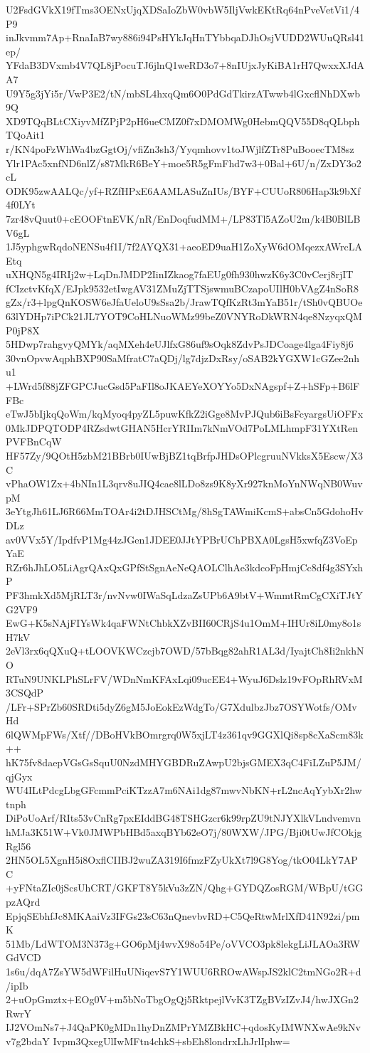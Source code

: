 U2FsdGVkX19fTms3OENxUjqXDSaIoZbW0vbW5IljVwkEKtRq64nPveVetVi1/4P9
inJkvmm7Ap+RnaIaB7wy886i94PsHYkJqHnTYbbqaDJhOsjVUDD2WUuQRsl41ep/
YFdaB3DVxmb4V7QL8jPocuTJ6jlnQ1weRD3o7+8nIUjxJyKiBA1rH7QwxxXJdAA7
U9Y5g3jYi5r/VwP3E2/tN/mbSL4hxqQm6O0PdGdTkirzATwwb4lGxcflNhDXwb9Q
XD9TQqBLtCXiyvMfZPjP2pH6ueCMZ0f7xDMOMWg0HebmQQV55D8qQLbphTQoAit1
r/KN4poFzWhWa4bzGgtOj/vfiZn3sh3/Yyqmhovv1toJWjlfZTr8PuBooecTM8sz
Ylr1PAc5xnfND6nlZ/s87MkR6BeY+moe5R5gFmFhd7w3+0Bal+6U/n/ZxDY3o2cL
ODK95zwAALQc/yf+RZfHPxE6AAMLASuZnIUs/BYF+CUUoR806Hap3k9bXf4f0LYt
7zr48vQuut0+cEOOFtnEVK/nR/EnDoqfudMM+/LP83Tl5AZoU2m/k4B0BlLBV6gL
1J5yphgwRqdoNENSu4f1I/7f2AYQX31+aeoED9uaH1ZoXyW6dOMqezxAWrcLAEtq
uXHQN5g4IRIj2w+LqDnJMDP2IinIZkaog7faEUg0fh930hwzK6y3C0vCerj8rjIT
fCIzctvKfqX/EJpk9532etIwgAV31ZMuZjTTSjswmuBCzapoUIlH0bVAgZ4nSoR8
gZx/r3+lpgQnKOSW6eJfaUeloU9sSsa2b/JrawTQfKzRt3mYaB51r/tSh0vQBUOe
63lYDHp7iPCk21JL7YOT9CoHLNuoWMz99beZ0VNYRoDkWRN4qe8NzyqxQMP0jP8X
5HDwp7rahgvyQMYk/aqMXeh4eUJlfxG86uf9sOqk8ZdvPsJDCoage4lga4Fiy8j6
30vnOpvwAqphBXP90SaMfratC7aQDj/lg7djzDxRsy/oSAB2kYGXW1cGZee2nhu1
+LWrd5f88jZFGPCJucGsd5PaFIl8oJKAEYeXOYYo5DxNAgspf+Z+hSFp+B6lFFBc
eTwJ5bIjkqQoWm/kqMyoq4pyZL5puwKfkZ2iGge8MvPJQub6iBsFcyargsUiOFFx
0MkJDPQTODP4RZsdwtGHAN5HcrYRIIm7kNmVOd7PoLMLhmpF31YXtRenPVFBnCqW
HF57Zy/9QOtH5zbM21BBrb0IUwBjBZ1tqBrfpJHDsOPlcgruuNVkksX5Escw/X3C
vPhaOW1Zx+4bNIn1L3qrv8uJIQ4cae8lLDo8zs9K8yXr927knMoYnNWqNB0WuvpM
3eYtgJh61LJ6R66MmTOAr4i2tDJHSCtMg/8hSgTAWmiKcmS+absCn5GdohoHvDLz
av0VVx5Y/IpdfvP1Mg44zJGen1JDEE0JJtYPBrUChPBXA0LgsH5xwfqZ3VoEpYaE
RZr6hJhLO5LiAgrQAxQxGPfStSgnAeNeQAOLClhAe3kdcoFpHmjCc8df4g3SYxhP
PF3hmkXd5MjRLT3r/nvNvw0IWaSqLdzaZsUPb6A9btV+WmmtRmCgCXiTJtYG2VF9
EwG+K5sNAjFIYsWk4qaFWNtChbkXZvBII60CRjS4u1OmM+IHUr8iL0my8o1sH7kV
2eVl3rx6qQXuQ+tLOOVKWCzcjb7OWD/57bBqg82ahR1AL3d/IyajtCh8Ii2nkhNO
RTuN9UNKLPhSLrFV/WDnNmKFAxLqi09ucEE4+WyuJ6Dslz19vFOpRhRVxM3CSQdP
/LFr+SPrZb60SRDti5dyZ6gM5JoEokEzWdgTo/G7XdulbzJbz7OSYWotfs/OMvHd
6lQWMpFWs/Xtf//DBoHVkBOmrgrq0W5xjLT4z361qv9GGXlQi8sp8cXaScm83k++
hK75fv8daepVGsGsSquU0NzdMHYGBDRuZAwpU2bjsGMEX3qC4FiLZuP5JM/qjGyx
WU4ILtPdcgLbgGFcmmPciKTzzA7m6NAi1dg87mwvNbKN+rL2ncAqYybXr2hwtnph
DiPoUoArf/RIts53vCnRg7pxEIddBG48TSHGzcr6k99rpZU9tNJYXlkVLndvemvn
hMJa3K51W+Vk0JMWPbHBd5axqBYb62eO7j/80WXW/JPG/Bji0tUwJfCOkjgRgl56
2HN5OL5XgnH5i8OxflCIIBJ2wuZA319I6fmzFZyUkXt7l9G8Yog/tkO04LkY7APC
+yFNtaZIc0jScsUhCRT/GKFT8Y5kVu3zZN/Qhg+GYDQZosRGM/WBpU/tGGpzAQrd
EpjqSEbhfJc8MKAaiVz3IFGs23sC63nQnevbvRD+C5QeRtwMrlXfD41N92zi/pmK
51Mb/LdWTOM3N373g+GO6pMj4wvX98o54Pe/oVVCO3pk8lekgLiJLAOa3RWGdVCD
1s6u/dqA7ZsYW5dWFilHuUNiqevS7Y1WUU6RROwAWspJS2klC2tmNGo2R+d/ipIb
2+uOpGmztx+EOg0V+m5bNoTbgOgQj5RktpejlVvK3TZgBVzIZvJ4/hwJXGn2RwrY
IJ2VOmNs7+J4QaPK0gMDn1hyDnZMPrYMZBkHC+qdosKyIMWNXwAe9kNvv7g2bdaY
Ivpm3QxegUlIwMFtn4chkS+sbEh8londrxLhJrlIphw=
